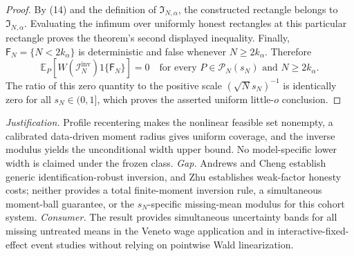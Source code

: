 \documentclass{article}
\begin{document}
\begin{proof}
By (14) and the definition of \(\mathfrak I_{N,\alpha}\), the constructed rectangle belongs to \(\mathfrak I_{N,\alpha}\).  Evaluating the infimum over uniformly honest rectangles at this particular rectangle proves the theorem's second displayed inequality.  Finally, \(\mathsf F_N=\{N<2k_\alpha\}\) is deterministic and false whenever \(N\geq2k_\alpha\).  Therefore
\[
 \mathbb E_P\!\left[W(\mathcal I_N^{\mathrm{inv}})1\{\mathsf F_N\}\right]=0
 \quad\text{for every }P\in\mathcal P_N(s_N)\text{ and }N\geq2k_\alpha.
\]
The ratio of this zero quantity to the positive scale \((\sqrt N s_N)^{-1}\) is identically zero for all \(s_N\in(0,1]\), which proves the asserted uniform little-\(o\) conclusion.
\end{proof}
\par\smallskip\noindent \textit{Justification.} Profile recentering makes the nonlinear feasible set nonempty, a calibrated data-driven moment radius gives uniform coverage, and the inverse modulus yields the unconditional width upper bound. No model-specific lower width is claimed under the frozen class. \textit{Gap.} Andrews and Cheng establish generic identification-robust inversion, and Zhu establishes weak-factor honesty costs; neither provides a total finite-moment inversion rule, a simultaneous moment-ball guarantee, or the \(s_N\)-specific missing-mean modulus for this cohort system. \textit{Consumer.} The result provides simultaneous uncertainty bands for all missing untreated means in the Veneto wage application and in interactive-fixed-effect event studies without relying on pointwise Wald linearization.
\end{document}
